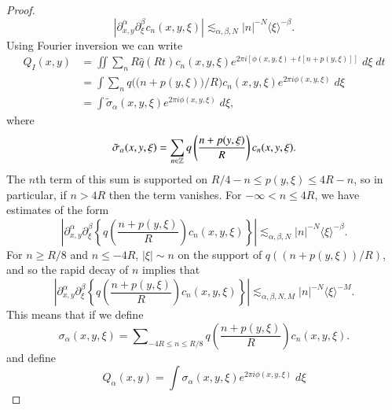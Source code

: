 \begin{proof}
    \begin{equation} |\partial_{x,y}^\alpha \partial_\xi^\beta c_n(x,y,\xi)| \lesssim_{\alpha,\beta,N} |n|^{-N} \langle \xi \rangle^{-\beta}. \end{equation}
    Using Fourier inversion we can write
    \begin{equation}
    \begin{split}
        Q_I(x,y) &= \iint \sum\nolimits_n R \widehat{q}(Rt) c_n(x,y,\xi) e^{2 \pi i [ \phi(x,y,\xi) + t [ n + p(y,\xi) ] ]}\; d\xi\; dt\\
        &= \int \sum\nolimits_n q \Big( \big( n + p(y,\xi) \big) / R \Big) c_n(x,y,\xi) e^{2 \pi i \phi(x,y,\xi)}\; d\xi\\
        &= \int \tilde{\sigma}_\alpha(x,y,\xi) e^{2 \pi i \phi(x,y,\xi)}\; d\xi, 
    \end{split}
    \end{equation}
    where
    \begin{equation} \tilde{\sigma}_\alpha(x,y,\xi) = \sum_{n \in \operatorname{\mathbb{Z}}} q \left( \frac{n + p(y,\xi)}{R} \right) c_n(x,y,\xi). \end{equation}
    The $n$th term of this sum is supported on $R/4 - n \leq p(y,\xi) \leq 4R - n$, so in particular, if $n > 4R$ then the term vanishes. For $-\infty < n \leq 4R$, we have estimates of the form
    \begin{equation} \left| \partial_{x,y}^\alpha \partial_\xi^\beta \left\{ q \left( \frac{n + p(y,\xi)}{R} \right) c_n(x,y,\xi) \right\} \right| \lesssim_{\alpha,\beta,N} |n|^{-N} \langle \xi \rangle^{-\beta}. \end{equation}
    For $n \geq R/8$ and $n \leq -4R$, $|\xi| \sim n$ on the support of $q( (n + p(y,\xi)) / R )$, and so the rapid decay of $n$ implies that 
    \begin{equation} \left| \partial_{x,y}^\alpha \partial_\xi^\beta \left\{ q \left( \frac{n + p(y,\xi)}{R} \right) c_n(x,y,\xi) \right\} \right| \lesssim_{\alpha,\beta,N,M} |n|^{-N} \langle \xi \rangle^{-M}. \end{equation}
    This means that if we define
    \begin{equation} \sigma_\alpha(x,y,\xi) = \sum\nolimits_{-4R \leq n \leq R/8} q \left( \frac{n + p(y,\xi)}{R} \right) c_n(x,y,\xi). \end{equation}
    and define
    \begin{equation} Q_\alpha(x,y) = \int \sigma_\alpha(x,y,\xi) e^{2 \pi i \phi(x,y,\xi)}\; d\xi \end{equation}

\end{proof}
